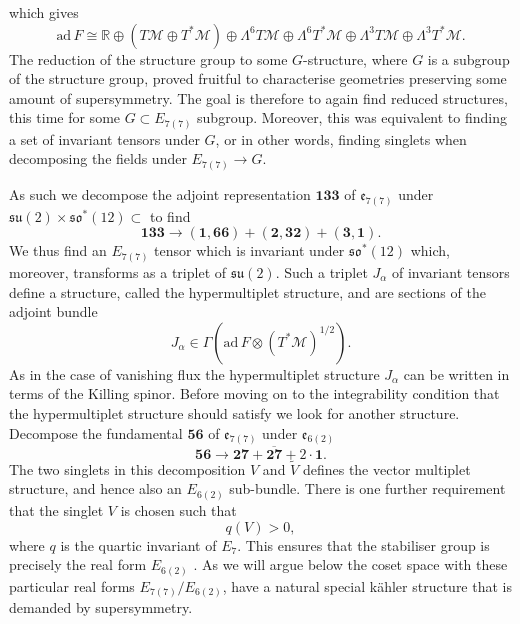 which gives 
\begin{equation}
    \text{ad}\,F \cong  \mathbb{R}\oplus\left(T\mathcal{M}\oplus T^*\mathcal{M}\right)\oplus\Lambda^6T\mathcal{M}\oplus\Lambda^6T^*\mathcal{M}\oplus\Lambda^3T\mathcal{M}\oplus\Lambda^3T^*\mathcal{M}.
\end{equation}
The reduction of the structure group to some $G$-structure, where $G$ is a subgroup of the structure group, proved fruitful to characterise geometries preserving some amount of supersymmetry. The goal is therefore to again find reduced structures, this time for some $G\subset E_{7(7)}$ subgroup. Moreover, this was equivalent to finding a set of invariant tensors under $G$, or in other words, finding singlets when decomposing the fields under $E_{7(7)}\to G$. 

As such we decompose the adjoint representation $\mathbf{133}$ of $\mathfrak{e}_{7(7)}$ under $\mathfrak{su}(2)\times\mathfrak{so}^*(12)\subset$ to find 
\begin{equation}
    \mathbf{133}\to (\mathbf{1},\mathbf{66})+(\mathbf{2},\mathbf{32})+(\mathbf{3},\mathbf{1}).
\end{equation}
We thus find an $E_{7(7)}$ tensor which is invariant under $\mathfrak{so}^*(12)$ which, moreover, transforms as a triplet of $\mathfrak{su}(2)$. Such a triplet $J_\alpha$ of invariant tensors define a structure, called the hypermultiplet structure, and are sections of the adjoint bundle 
\begin{equation}
    J_\alpha \in \Gamma(\text{ad}\, F\otimes \left(T^*\mathcal{M}\right)^{1/2}).
\end{equation}
As in the case of vanishing flux the hypermultiplet structure $J_\alpha$ can be written in terms of the Killing spinor. Before moving on to the integrability condition that the hypermultiplet structure should satisfy we look for another structure. Decompose the fundamental $\mathbf{56}$ of $\mathfrak{e}_{7(7)}$ under $\mathfrak{e}_{6(2)}$
\begin{equation}
    \mathbf{56}\to\mathbf{27}+\overbar{\mathbf{27}}+2\cdot \mathbf{1}.
\end{equation}
The two singlets in this decomposition $V$ and $\tilde{V}$ defines the vector multiplet structure, and hence also an $E_{6(2)}$ sub-bundle. There is one further requirement that the singlet $V$ is chosen such that 
\begin{equation}
    q(V)>0,
\end{equation}
where $q$ is the quartic invariant of $E_7$. This ensures that the stabiliser group is precisely the real form $E_{6(2)}$ \cite{Ferrara:1997uz}. As we will argue below the coset space with these particular real forms $E_{7(7)}/E_{6(2)}$, have a natural special kähler structure that is demanded by supersymmetry. 

